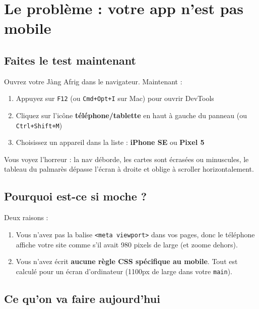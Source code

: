 \documentclass[11pt,a4paper]{article}
\begin{document}
\tableofcontents

\newpage

\section{Le problème : votre app n'est pas mobile}

\subsection{Faites le test maintenant}

Ouvrez votre Jàng Afrig dans le navigateur. Maintenant :
\begin{enumerate}[nosep]
    \item Appuyez sur \texttt{F12} (ou \texttt{Cmd+Opt+I} sur Mac) pour ouvrir DevTools
    \item Cliquez sur l'icône \textbf{téléphone/tablette} en haut à gauche du panneau (ou \texttt{Ctrl+Shift+M})
    \item Choisissez un appareil dans la liste : \textbf{iPhone SE} ou \textbf{Pixel 5}
\end{enumerate}

Vous voyez l'horreur : la nav déborde, les cartes sont écrasées ou
minuscules, le tableau du palmarès dépasse l'écran à droite et oblige à
scroller horizontalement.

\subsection{Pourquoi est-ce si moche ?}

Deux raisons :

\begin{enumerate}[leftmargin=*,nosep]
    \item Vous n'avez pas la balise \texttt{<meta viewport>} dans vos pages, donc le téléphone affiche votre site comme s'il avait 980 pixels de large (et zoome dehors).
    \item Vous n'avez écrit \textbf{aucune règle CSS spécifique au mobile}. Tout est calculé pour un écran d'ordinateur (1100px de large dans votre \texttt{main}).
\end{enumerate}

\subsection{Ce qu'on va faire aujourd'hui}
\end{document}
